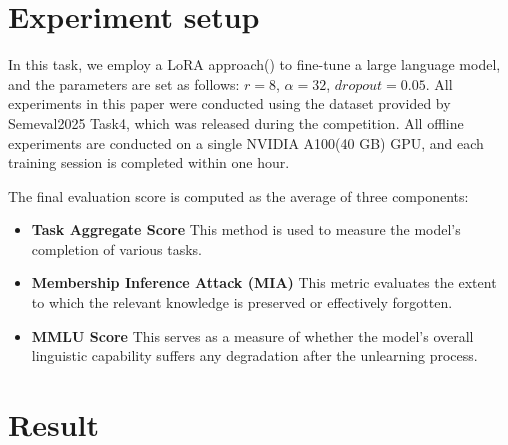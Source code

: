 \documentclass[11pt]{article}
\begin{document}
\section{Experiment setup}


In this task, we employ a LoRA approach(\citet{hu2022lora}) to fine-tune a large language model, and the parameters are set as follows: $r=8$, $\alpha=32$, $dropout=0.05$.
All experiments in this paper were conducted using the dataset provided by Semeval2025 Task4\citep{ramakrishna2025lumellmunlearningmultitask}, which was released during the competition. 
All offline experiments are conducted on a single NVIDIA A100(40 GB) GPU, and each training session is completed within one hour. 

The final evaluation score is computed as the average of three components:

\begin{itemize}
\item \noindent\textbf{Task Aggregate Score} This method is used to measure the model's completion of various tasks.

\item \noindent\textbf{Membership Inference Attack (MIA)} This metric evaluates the extent to which the relevant knowledge is preserved or effectively forgotten.

\item \noindent\textbf{MMLU Score} This serves as a measure of whether the model’s overall linguistic capability suffers any degradation after the unlearning process.
\end{itemize}

\section{Result}


\end{document}
